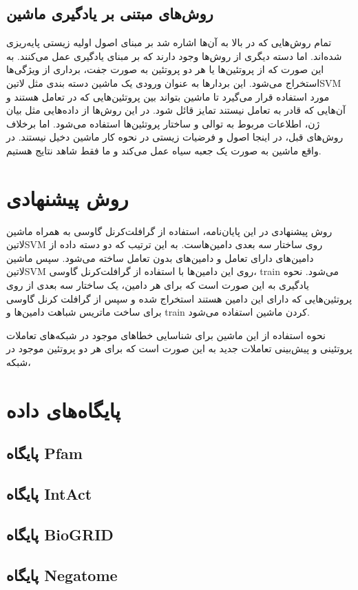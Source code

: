 \subsection{روش‌های مبتنی بر یادگیری ماشین}
تمام روش‌هایی که در بالا به آن‌ها اشاره شد بر مبنای اصول اولیه زیستی پایه‌ریزی شده‌اند. اما دسته دیگری از روش‌ها وجود دارند که بر مبنای یادگیری عمل می‌کنند. به این صورت که از پروتئین‌ها یا هر دو پروتئین به صورت جفت، برداری از ویژگی‌ها استخراج می‌شود. این بردارها به عنوان ورودی یک ماشین دسته بندی مثل ‌لاتین{SVM} مورد استفاده قرار می‌گیرد تا ماشین بتواند بین پروتئین‌هایی که در تعامل هستند و آن‌هایی که قادر به تعامل نیستند تمایز قائل شود. در این روش‌ها از داده‌هایی مثل بیان ژن‌، اطلاعات مربوط به توالی و ساختار پروتئین‌ها استفاده می‌شود. اما برخلاف روش‌های قبل، در اینجا اصول و فرضیات زیستی در نحوه کار ماشین دخیل نیستند. در واقع ماشین به صورت یک جعبه سیاه عمل می‌کند و ما فقط شاهد نتایج هستیم.

\section{روش پیشنهادی}
روش پیشنهادی در این پایان‌نامه، استفاده از گرافلت‌کرنل گاوسی به همراه ماشین ‌لاتین{SVM} روی ساختار سه بعدی دامین‌هاست. به این ترتیب که دو دسته داده از دامین‌های دارای تعامل و دامین‌های بدون تعامل ساخته می‌شود. سپس ماشین ‌لاتین{SVM} روی این دامین‌ها با استفاده از گرافلت‌کرنل گاوسی، train می‌شود. نحوه یادگیری به این صورت است که برای هر دامین، یک ساختار سه بعدی از روی پروتئین‌هایی که دارای این دامین هستند استخراج شده و سپس از گرافلت کرنل گاوسی برای ساخت ماتریس شباهت دامین‌ها و train کردن ماشین استفاده می‌شود.

نحوه استفاده از این ماشین برای شناسایی خطاهای موجود در شبکه‌های تعاملات پروتئینی و پیش‌بینی تعاملات جدید به این صورت است که برای هر دو پروتئین موجود در شبکه، 

\section{پایگاه‌های داده}
\subsection{پایگاه Pfam}
\subsection{پایگاه IntAct}
\subsection{پایگاه BioGRID}
\subsection{پایگاه Negatome}


